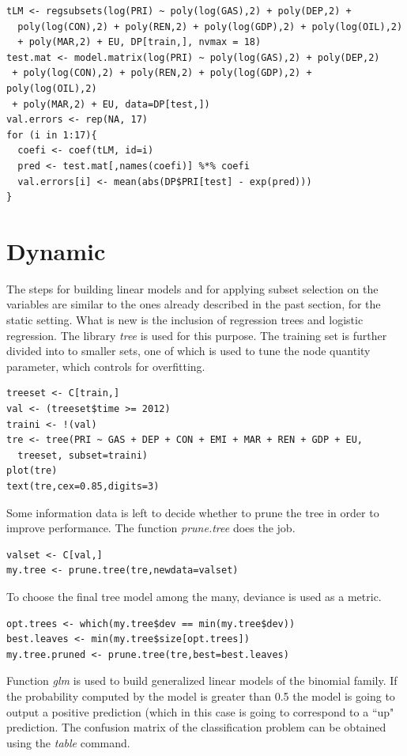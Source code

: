 \documentclass[a4paper,12pt]{book}
\begin{document}
\begin{verbatim}
tLM <- regsubsets(log(PRI) ~ poly(log(GAS),2) + poly(DEP,2) +
  poly(log(CON),2) + poly(REN,2) + poly(log(GDP),2) + poly(log(OIL),2) 
  + poly(MAR,2) + EU, DP[train,], nvmax = 18)
test.mat <- model.matrix(log(PRI) ~ poly(log(GAS),2) + poly(DEP,2)
 + poly(log(CON),2) + poly(REN,2) + poly(log(GDP),2) + poly(log(OIL),2)
 + poly(MAR,2) + EU, data=DP[test,])
val.errors <- rep(NA, 17)
for (i in 1:17){
  coefi <- coef(tLM, id=i)
  pred <- test.mat[,names(coefi)] %*% coefi
  val.errors[i] <- mean(abs(DP$PRI[test] - exp(pred)))
}
\end{verbatim}

\section*{Dynamic}

The steps for building linear models and for applying subset selection on the variables are similar to the ones already described in the past section, for the static setting. What is new is the inclusion of regression trees and logistic regression. The library \textit{tree} is used for this purpose. The training set is further divided into to smaller sets, one of which is used to tune the node quantity parameter, which controls for overfitting.

\begin{verbatim}
treeset <- C[train,]
val <- (treeset$time >= 2012)
traini <- !(val)
tre <- tree(PRI ~ GAS + DEP + CON + EMI + MAR + REN + GDP + EU,
  treeset, subset=traini)
plot(tre)
text(tre,cex=0.85,digits=3)
\end{verbatim}

Some information data is left to decide whether to prune the tree in order to improve performance. The function \textit{prune.tree} does the job.

\begin{verbatim}
valset <- C[val,]
my.tree <- prune.tree(tre,newdata=valset)
\end{verbatim}

To choose the final tree model among the many, deviance is used as a metric.

\begin{verbatim}
opt.trees <- which(my.tree$dev == min(my.tree$dev))
best.leaves <- min(my.tree$size[opt.trees])
my.tree.pruned <- prune.tree(tre,best=best.leaves)
\end{verbatim}

Function \textit{glm} is used to build generalized linear models of the binomial family. If the probability computed by the model is greater than 0.5 the model is going to output a positive prediction (which in this case is going to correspond to a ``up" prediction. The confusion matrix of the classification problem can be obtained using the \textit{table} command. 
\end{document}
